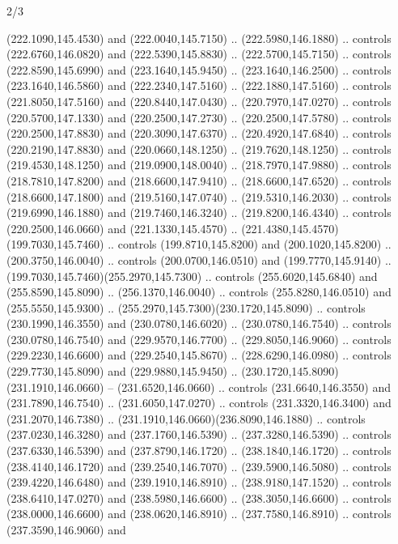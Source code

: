 \begin{flagdescription}{2/3}
\begin{scope}[xshift=0.5\flaglength,yshift=0.5\flagwidth,scale=\flagwidth/259.2]
\begin{scope}[y=0.8pt, x=0.8pt, yscale=-1,shift={(-243,-162)}]
      (222.1090,145.4530) and (222.0040,145.7150) .. (222.5980,146.1880) .. controls
      (222.6760,146.0820) and (222.5390,145.8830) .. (222.5700,145.7150) .. controls
      (222.8590,145.6990) and (223.1640,145.9450) .. (223.1640,146.2500) .. controls
      (223.1640,146.5860) and (222.2340,147.5160) .. (222.1880,147.5160) .. controls
      (221.8050,147.5160) and (220.8440,147.0430) .. (220.7970,147.0270) .. controls
      (220.5700,147.1330) and (220.2500,147.2730) .. (220.2500,147.5780) .. controls
      (220.2500,147.8830) and (220.3090,147.6370) .. (220.4920,147.6840) .. controls
      (220.2190,147.8830) and (220.0660,148.1250) .. (219.7620,148.1250) .. controls
      (219.4530,148.1250) and (219.0900,148.0040) .. (218.7970,147.9880) .. controls
      (218.7810,147.8200) and (218.6600,147.9410) .. (218.6600,147.6520) .. controls
      (218.6600,147.1800) and (219.5160,147.0740) .. (219.5310,146.2030) .. controls
      (219.6990,146.1880) and (219.7460,146.3240) .. (219.8200,146.4340) .. controls
      (220.2500,146.0660) and (221.1330,145.4570) ..
      (221.4380,145.4570)(199.7030,145.7460) .. controls (199.8710,145.8200) and
      (200.1020,145.8200) .. (200.3750,146.0040) .. controls (200.0700,146.0510) and
      (199.7770,145.9140) .. (199.7030,145.7460)(255.2970,145.7300) .. controls
      (255.6020,145.6840) and (255.8590,145.8090) .. (256.1370,146.0040) .. controls
      (255.8280,146.0510) and (255.5550,145.9300) ..
      (255.2970,145.7300)(230.1720,145.8090) .. controls (230.1990,146.3550) and
      (230.0780,146.6020) .. (230.0780,146.7540) .. controls (230.0780,146.7540) and
      (229.9570,146.7700) .. (229.8050,146.9060) .. controls (229.2230,146.6600) and
      (229.2540,145.8670) .. (228.6290,146.0980) .. controls (229.7730,145.8090) and
      (229.9880,145.9450) .. (230.1720,145.8090)(231.1910,146.0660) --
      (231.6520,146.0660) .. controls (231.6640,146.3550) and (231.7890,146.7540) ..
      (231.6050,147.0270) .. controls (231.3320,146.3400) and (231.2070,146.7380) ..
      (231.1910,146.0660)(236.8090,146.1880) .. controls (237.0230,146.3280) and
      (237.1760,146.5390) .. (237.3280,146.5390) .. controls (237.6330,146.5390) and
      (237.8790,146.1720) .. (238.1840,146.1720) .. controls (238.4140,146.1720) and
      (239.2540,146.7070) .. (239.5900,146.5080) .. controls (239.4220,146.6480) and
      (239.1910,146.8910) .. (238.9180,147.1520) .. controls (238.6410,147.0270) and
      (238.5980,146.6600) .. (238.3050,146.6600) .. controls (238.0000,146.6600) and
      (238.0620,146.8910) .. (237.7580,146.8910) .. controls (237.3590,146.9060) and

\end{scope}
\end{scope}
\end{flagdescription}
